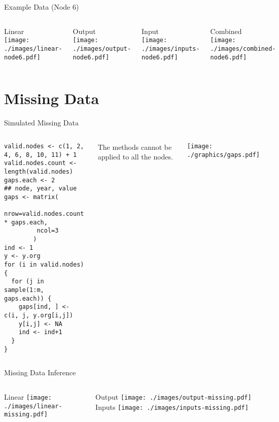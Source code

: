 \documentclass{beamer}
\begin{document}
\begin{frame}{Example Data (Node 6)}

  \begin{columns}
    Linear\\
    \texttt{[image: ./images/linear-node6.pdf]}
    \pause

    Output\\
    \texttt{[image: ./images/output-node6.pdf]}

    \pause

    Input\\
    \texttt{[image: ./images/inputs-node6.pdf]}

    \pause
    Combined\\
    \texttt{[image: ./images/combined-node6.pdf]}
  \end{columns} 
\end{frame}


\section{Missing Data}
\begin{frame}[containsverbatim]{Simulated Missing Data}
  \begin{columns}

\begin{verbatim}
valid.nodes <- c(1, 2, 4, 6, 8, 10, 11) + 1
valid.nodes.count <- length(valid.nodes)
gaps.each <- 2
## node, year, value
gaps <- matrix(
         nrow=valid.nodes.count * gaps.each,
         ncol=3
        )
ind <- 1
y <- y.org
for (i in valid.nodes) {
  for (j in sample(1:m, gaps.each)) {
    gaps[ind, ] <- c(i, j, y.org[i,j])
    y[i,j] <- NA
    ind <- ind+1
  }
}
\end{verbatim}

    
    The methods cannot be applied to all the nodes.

    \vspace{0.4cm}
    
    \texttt{[image: ./graphics/gaps.pdf]}
  \end{columns}
\end{frame}

\begin{frame}{Missing Data Inference}

  \begin{columns}
      Linear
    \texttt{[image: ./images/linear-missing.pdf]}
    
      Output
    \texttt{[image: ./images/output-missing.pdf]}
      Inputs
    \texttt{[image: ./images/inputs-missing.pdf]}
  \end{columns} 
\end{frame}
\end{document}
